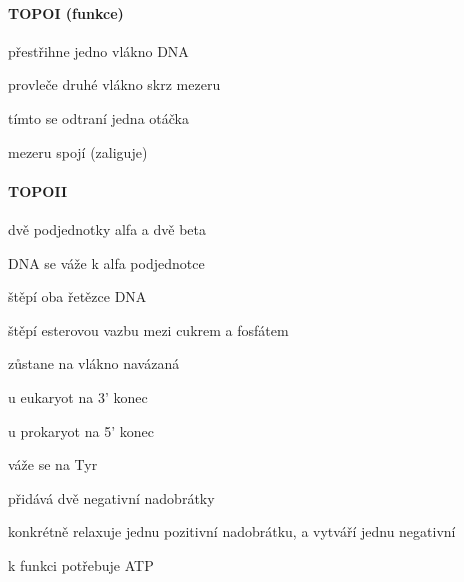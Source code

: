 \documentclass[DIV=8]{scrreprt}
\begin{document}
\paragraph{TOPOI (funkce)}
\begin{myEnumerate}[nosep]
    \item přestřihne jedno vlákno DNA
    \item provleče druhé vlákno skrz mezeru
\begin{myItemize}[nosep]
    \item tímto se odtraní jedna otáčka
\end{myItemize}

    \item mezeru spojí (zaliguje)
\end{myEnumerate}



\paragraph{TOPOII}
\begin{myItemize}[nosep]
    \item dvě podjednotky alfa a dvě beta
\begin{myItemize}[nosep]
    \item DNA se váže k alfa podjednotce
\end{myItemize}

    \item štěpí oba řetězce DNA
\begin{myItemize}[nosep]
    \item štěpí esterovou vazbu mezi cukrem a fosfátem
    \item zůstane na vlákno navázaná
\begin{myItemize}[nosep]
    \item u eukaryot na 3' konec
    \item u prokaryot na 5' konec
\end{myItemize}

    \item váže se na Tyr
\end{myItemize}

    \item přidává dvě negativní nadobrátky
\begin{myItemize}[nosep]
    \item konkrétně relaxuje jednu pozitivní nadobrátku, a vytváří jednu negativní
\end{myItemize}

    \item k funkci potřebuje ATP
\end{myItemize}
\end{document}
